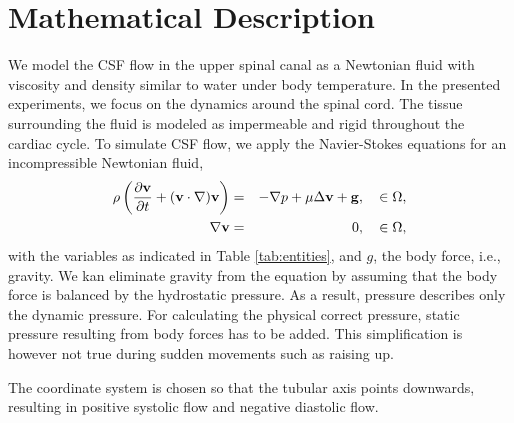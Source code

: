 \section{Mathematical Description}

We model the CSF flow in the upper spinal canal as a Newtonian fluid  with viscosity and density similar to water under body temperature. In the presented experiments, we focus on the dynamics around the spinal cord. The tissue surrounding the fluid is modeled as impermeable and rigid throughout the cardiac cycle. To simulate CSF flow, we apply the Navier-Stokes  equations for an incompressible Newtonian fluid,  
\begin{eqnarray*}
\rho \left(\frac{\partial \mathbf{v}}{\partial t} + (\mathbf{v}\cdot\nabla) \mathbf{v}\right) &=& -\nabla p + \mu \Delta \mathbf{v} + \mathbf{g}, \quad \in \Omega, \\ 
\nabla \mathbf{v} &=& 0, \quad \in \Omega, 
\end{eqnarray*}
with the variables as indicated in Table \ref{tab:entities}, and $g$, the body force, i.e., gravity. We kan eliminate gravity from the equation by assuming that the body force is balanced by the hydrostatic pressure. As a result, pressure describes only the dynamic pressure. For calculating the physical correct pressure, static pressure resulting from body forces has to be added. This simplification is however not true during sudden movements such as raising up.  

The coordinate system is chosen so that the tubular axis points downwards, resulting in  positive systolic flow and negative diastolic flow.  

